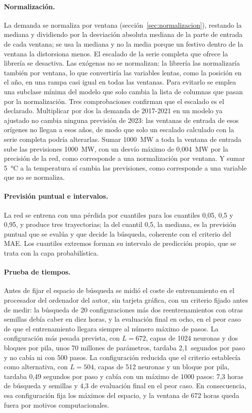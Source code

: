 \paragraph{Normalización.} La demanda se normaliza por ventana
(sección~\ref{sec:normalizacion}), restando la mediana y dividiendo por la
desviación absoluta mediana de la parte de entrada de cada ventana; se usa
la mediana y no la media porque un festivo dentro de la ventana la distorsiona
menos. El escalado de la serie completa que ofrece la librería se desactiva.
Las exógenas no se normalizan: la librería las normalizaría también por
ventana, lo que convertiría las variables lentas, como la posición en el año,
en una rampa casi igual en todas las ventanas. Para evitarlo se emplea una
subclase mínima del modelo que solo cambia la lista de columnas que pasan por
la normalización. Tres comprobaciones confirman que el escalado es el
declarado. Multiplicar por dos la demanda de 2017-2021 en un modelo ya
ajustado no cambia ninguna previsión de 2023: las ventanas de entrada de esos
orígenes no llegan a esos años, de modo que solo un escalado calculado con
la serie completa podría alterarlas. Sumar 1000~MW a toda la ventana de
entrada sube las previsiones 1000~MW, con un desvío máximo de 0,004~MW por la
precisión de la red, como corresponde a una normalización por ventana. Y
sumar 5~°C a la temperatura sí cambia las previsiones, como corresponde a una
variable que no se normaliza.

\paragraph{Previsión puntual e intervalos.} La red se entrena con una pérdida
por cuantiles para los cuantiles 0,05, 0,5 y 0,95, y produce tres
trayectorias; la del cuantil 0,5, la mediana, es la previsión puntual que se
evalúa y que decide la búsqueda, coherente con el criterio del MAE. Los
cuantiles extremos forman su intervalo de predicción propio, que se trata
con la capa probabilística.

\paragraph{Prueba de tiempos.} Antes de fijar el espacio de búsqueda se midió
el coste de entrenamiento en el procesador del ordenador del autor, sin
tarjeta gráfica, con un criterio
fijado antes de medir: la búsqueda de 20 configuraciones más dos
reentrenamientos con otras semillas debía caber en diez horas, y la
evaluación final en ocho, en el peor caso de que el entrenamiento llegara
siempre al número máximo de pasos. La configuración más pesada prevista, con
$L = 672$, capas de 1024 neuronas y dos bloques por pila, unos 70 millones de
parámetros, tardaba 2,1~segundos por paso y no cabía ni con 500 pasos. La
configuración reducida que el criterio establecía como alternativa, con
$L = 504$, capas de 512 neuronas y un bloque por pila, tardaba 0,49 segundos
por paso y cabía con un máximo de 1000 pasos: 7,3 horas de búsqueda y
semillas y 4,3 de evaluación final en el peor caso. En consecuencia, esa configuración fija los
máximos del espacio, y la ventana de 672 horas queda fuera por motivos
computacionales.

